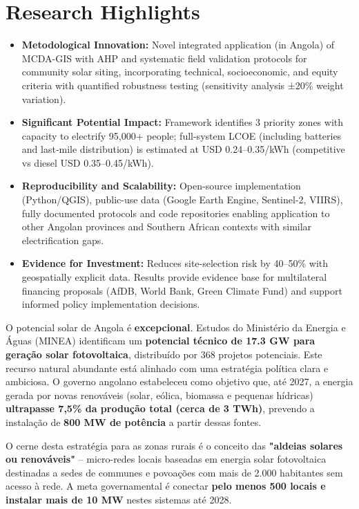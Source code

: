 \documentclass[12pt, a4paper]{article}
\begin{document}
\section*{Research Highlights}
\begin{itemize}
    \item \textbf{Metodological Innovation:} Novel integrated application (in Angola) of MCDA-GIS with AHP and systematic field validation protocols for community solar siting, incorporating technical, socioeconomic, and equity criteria with quantified robustness testing (sensitivity analysis ±20\% weight variation).
    \item \textbf{Significant Potential Impact:} Framework identifies 3 priority zones with capacity to electrify 95,000+ people; full-system LCOE (including batteries and last‑mile distribution) is estimated at USD 0.24–0.35/kWh (competitive vs diesel USD 0.35–0.45/kWh).
    \item \textbf{Reproducibility and Scalability:} Open-source implementation (Python/QGIS), public-use data (Google Earth Engine, Sentinel-2, VIIRS), fully documented protocols and code repositories enabling application to other Angolan provinces and Southern African contexts with similar electrification gaps.
    \item \textbf{Evidence for Investment:} Reduces site-selection risk by 40–50\% with geospatially explicit data. Results provide evidence base for multilateral financing proposals (AfDB, World Bank, Green Climate Fund) and support informed policy implementation decisions.
\end{itemize}


\newpage

\tableofcontents

\newpage

O potencial solar de Angola é 
\textbf{excepcional}. Estudos do Ministério da Energia e Águas (MINEA) identificam um 
\textbf{potencial técnico de 17.3 GW para geração solar fotovoltaica}, distribuído por 368 projetos potenciais. Este recurso natural abundante está alinhado com uma estratégia política clara e ambiciosa. O governo angolano estabeleceu como objetivo que, até 2027, a energia gerada por novas renováveis (solar, eólica, biomassa e pequenas hídricas) 
\textbf{ultrapasse 7,5\% da produção total (cerca de 3 TWh)}, prevendo a instalação de 
\textbf{800 MW de potência} a partir dessas fontes.

O cerne desta estratégia para as zonas rurais é o conceito das 
\textbf{"aldeias solares ou renováveis"} – micro-redes locais baseadas em energia solar fotovoltaica destinadas a sedes de communes e povoações com mais de 2.000 habitantes sem acesso à rede. A meta governamental é conectar 
\textbf{pelo menos 500 locais e instalar mais de 10 MW} nestes sistemas até 2028. 
\end{document}
